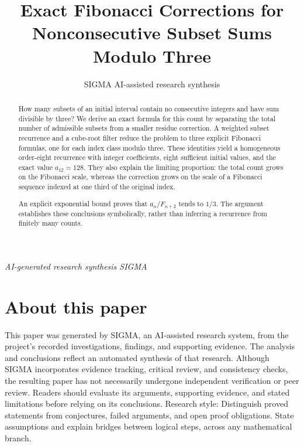 \documentclass[11pt]{article}
\title{Exact Fibonacci Corrections for Nonconsecutive Subset Sums Modulo Three}
\date{}
\author{SIGMA AI-assisted research synthesis}
\begin{document}
\maketitle
\begin{center}\end{center}
\begin{center}\small\textit{AI-generated research synthesis \textperiodcentered{} SIGMA}\end{center}

\begin{abstract}
How many subsets of an initial interval contain no consecutive integers and have sum divisible by three? We derive an exact formula for this count by separating the total number of admissible subsets from a smaller residue correction. A weighted subset recurrence and a cube-root filter reduce the problem to three explicit Fibonacci formulas, one for each index class modulo three. These identities yield a homogeneous order-eight recurrence with integer coefficients, eight sufficient initial values, and the exact value $a_{12}=128$. They also explain the limiting proportion: the total count grows on the Fibonacci scale, whereas the correction grows on the scale of a Fibonacci sequence indexed at one third of the original index.

An explicit exponential bound proves that $a_n/F_{n+2}$ tends to $1/3$. The argument establishes these conclusions symbolically, rather than inferring a recurrence from finitely many counts.
\end{abstract}
\section*{About this paper}
This paper was generated by SIGMA, an AI-assisted research system, from the project's recorded investigations, findings, and supporting evidence.
The analysis and conclusions reflect an automated synthesis of that research. Although SIGMA incorporates evidence tracking, critical review, and consistency checks, the resulting paper has not necessarily undergone independent verification or peer review.
Readers should evaluate its arguments, supporting evidence, and stated limitations before relying on its conclusions.
Research style: Distinguish proved statements from conjectures, failed arguments, and open proof obligations. State assumptions and explain bridges between logical steps, across any mathematical branch.
\end{document}
